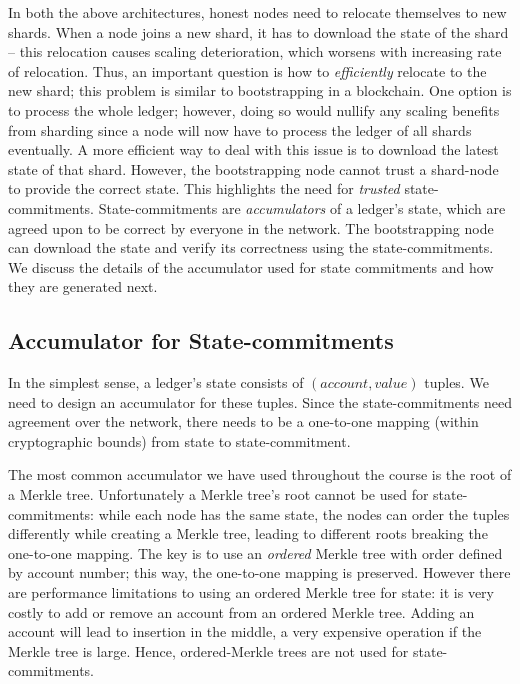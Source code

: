 \documentclass{article}
\begin{document}
In both the above architectures, honest nodes need to relocate themselves to new shards.  When a node joins a new shard, it has to download the state of the shard -- this relocation causes scaling deterioration, which worsens with increasing rate of relocation.   Thus, an important question is how to {\em efficiently} relocate to the new shard; this problem is similar to bootstrapping in a blockchain. One option is to process the whole ledger; however, doing so would  nullify any scaling benefits from sharding since a node will now have to process the ledger of all shards eventually. A more efficient way to deal with this issue is to download the latest state of that shard. However, the bootstrapping node  cannot trust  a shard-node to provide the correct state. This highlights the need for {\em trusted} state-commitments. State-commitments are {\em accumulators} of a ledger's state, which are agreed upon to be correct by everyone in the network. The bootstrapping node can download the state and verify its correctness using the state-commitments. We discuss the details of the accumulator used for state commitments and how they are generated next.

\subsection{Accumulator for State-commitments}
In the simplest sense, a ledger's state consists of $(account, value)$ tuples. We need to design an accumulator for these tuples. Since the state-commitments need agreement over the network, there needs to be a one-to-one mapping (within cryptographic bounds) from state to state-commitment. 

The most common accumulator we have used throughout the course is the root of a Merkle tree. Unfortunately  a Merkle tree's root cannot be used for state-commitments: while each node has the same state, the nodes can order the tuples differently while creating a Merkle tree, leading to different roots breaking the one-to-one mapping. The key is to  use an {\em ordered} Merkle tree with order defined by account number; this way, the one-to-one mapping is preserved. However there are performance limitations to using an ordered Merkle tree for state: it is very costly to add or remove an account from an ordered Merkle tree. Adding an account will lead to insertion in the middle, a very expensive operation if the Merkle tree is large. Hence, ordered-Merkle trees  are not used for state-commitments. 
\end{document}
